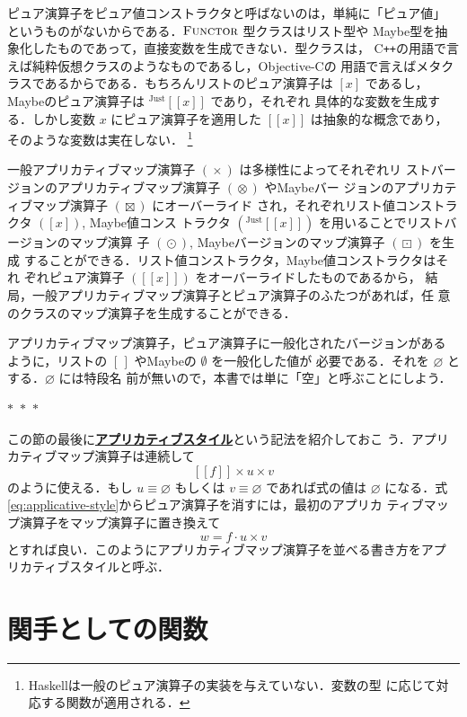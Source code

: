 \documentclass[a5paper,twoside,fleqn,draft]{jsbook}
\def\[{[\![}
\def\]{]\!]}
\newcommand{\separator}{\begin{center}$*$~$*$~$*$\end{center}}
\newcommand{\programminglanguage}[1]{\textsf{#1}}
\newcommand{\cxx}{\programminglanguage{C}\texttt{++}}
\newcommand{\haskell}{\programminglanguage{Haskell}}
\newcommand{\objectivec}{\programminglanguage{Objective-C}}
\newcommand{\keyword}[1]{{\underline{\textbf{#1}}}}
\newcommand{\mEmptyList}{{[\,]}}
\newcommand{\mNothing}{\emptyset}
\newcommand{\mPureNothing}{\varnothing}
\DeclareMathOperator{\mAppMap}{\times}
\DeclareMathOperator{\mAppMapList}{\otimes}
\DeclareMathOperator{\mAppMapMaybe}{\boxtimes}
\DeclareMathOperator{\mMap}{\cdot}
\DeclareMathOperator{\mMapList}{\odot}
\DeclareMathOperator{\mMapMaybe}{\boxdot}
\newcommand{\mValueConstructor}[1]{\mathrm{#1}}
\newcommand{\mValueWith}[2]{{}^\mValueConstructor{#1}\[#2\]}
\newcommand{\mJustWith}[1]{\mValueWith{Just}{#1}}
\newcommand{\mPureWith}[1]{\[#1\]}
\newcommand{\mTypeClass}[1]{\textsc{#1}} %
\newcommand{\mFunctorTypeClass}{\mTypeClass{Functor}}
\begin{document}
ピュア演算子をピュア値コンストラクタと呼ばないのは，単純に「ピュア値」
というものがないからである．$\mFunctorTypeClass$ 型クラスはリスト型や
Maybe型を抽象化したものであって，直接変数を生成できない．型クラスは，
\cxx の用語で言えば純粋仮想クラスのようなものであるし，\objectivec の
用語で言えばメタクラスであるからである．もちろんリストのピュア演算子は
$[x]$ であるし，Maybeのピュア演算子は $\mJustWith{x}$ であり，それぞれ
具体的な変数を生成する．しかし変数 $x$ にピュア演算子を適用した
$\mPureWith{x}$ は抽象的な概念であり，そのような変数は実在しない．
\footnote{\haskell は一般のピュア演算子の実装を与えていない．変数の型
  に応じて対応する関数が適用される．}

一般アプリカティブマップ演算子 $(\mAppMap)$ は多様性によってそれぞれリ
ストバージョンのアプリカティブマップ演算子 $(\mAppMapList)$ やMaybeバー
ジョンのアプリカティブマップ演算子 $(\mAppMapMaybe)$ にオーバーライド
され，それぞれリスト値コンストラクタ $([x])$, Maybe値コンス
トラクタ $(\mJustWith{x})$ を用いることでリストバージョンのマップ演算
子 $(\mMapList)$, Maybeバージョンのマップ演算子 $(\mMapMaybe)$ を生成
することができる．リスト値コンストラクタ，Maybe値コンストラクタはそれ
ぞれピュア演算子 $(\mPureWith{x})$ をオーバーライドしたものであるから，
結局，一般アプリカティブマップ演算子とピュア演算子のふたつがあれば，任
意のクラスのマップ演算子を生成することができる．

アプリカティブマップ演算子，ピュア演算子に一般化されたバージョンがある
ように，リストの $\mEmptyList$ やMaybeの $\mNothing$ を一般化した値が
必要である．それを $\mPureNothing$ とする．$\mPureNothing$ には特段名
前が無いので，本書では単に「空」と呼ぶことにしよう．

\separator

この節の最後に\keyword{アプリカティブスタイル}という記法を紹介しておこ
う．アプリカティブマップ演算子は連続して
\begin{equation}
  \label{eq:applicative-style}
  \mPureWith{f}\mAppMap u\mAppMap v
\end{equation}
のように使える．もし $u\equiv\mPureNothing$ もしくは
$v\equiv\mPureNothing$ であれば式の値は $\mPureNothing$ になる．式
\eqref{eq:applicative-style}からピュア演算子を消すには，最初のアプリカ
ティブマップ演算子をマップ演算子に置き換えて
\begin{equation}
  w
  =f\mMap u\mAppMap v
\end{equation}
とすれば良い．このようにアプリカティブマップ演算子を並べる書き方をアプ
リカティブスタイルと呼ぶ．

\section{関手としての関数}
\end{document}
